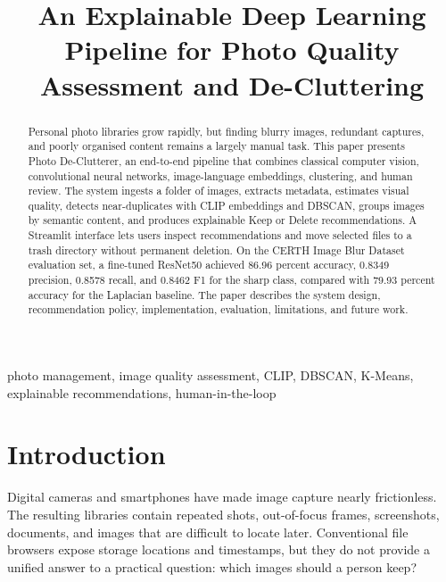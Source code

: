 \documentclass[conference]{IEEEtran}
\newcommand{\project}{Photo De-Clutterer}
\begin{document}
\title{An Explainable Deep Learning Pipeline for Photo Quality Assessment and De-Cluttering}

\author{
}

\maketitle

\begin{abstract}
Personal photo libraries grow rapidly, but finding blurry images, redundant captures, and poorly organised content remains a largely manual task. This paper presents \project{}, an end-to-end pipeline that combines classical computer vision, convolutional neural networks, image-language embeddings, clustering, and human review. The system ingests a folder of images, extracts metadata, estimates visual quality, detects near-duplicates with CLIP embeddings and DBSCAN, groups images by semantic content, and produces explainable Keep or Delete recommendations. A Streamlit interface lets users inspect recommendations and move selected files to a trash directory without permanent deletion. On the CERTH Image Blur Dataset evaluation set, a fine-tuned ResNet50 achieved 86.96 percent accuracy, 0.8349 precision, 0.8578 recall, and 0.8462 F1 for the sharp class, compared with 79.93 percent accuracy for the Laplacian baseline. The paper describes the system design, recommendation policy, implementation, evaluation, limitations, and future work.
\end{abstract}

\begin{IEEEkeywords}
photo management, image quality assessment, CLIP, DBSCAN, K-Means, explainable recommendations, human-in-the-loop
\end{IEEEkeywords}

\section{Introduction}
Digital cameras and smartphones have made image capture nearly frictionless. The resulting libraries contain repeated shots, out-of-focus frames, screenshots, documents, and images that are difficult to locate later. Conventional file browsers expose storage locations and timestamps, but they do not provide a unified answer to a practical question: which images should a person keep?
\end{document}

